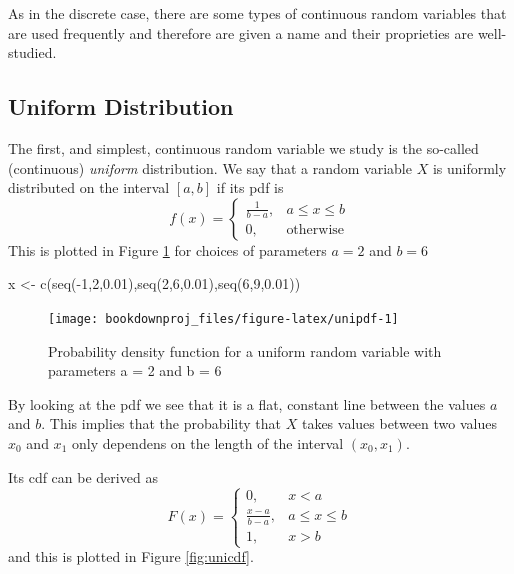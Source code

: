 \documentclass[
]{book}
\newenvironment{Shaded}{\begin{snugshade}}{\end{snugshade}}
\newcommand{\DecValTok}[1]{\textcolor[rgb]{0.00,0.00,0.81}{#1}}
\newcommand{\FloatTok}[1]{\textcolor[rgb]{0.00,0.00,0.81}{#1}}
\newcommand{\FunctionTok}[1]{\textcolor[rgb]{0.00,0.00,0.00}{#1}}
\newcommand{\NormalTok}[1]{#1}
\newcommand{\OtherTok}[1]{\textcolor[rgb]{0.56,0.35,0.01}{#1}}
\newcommand{\SpecialCharTok}[1]{\textcolor[rgb]{0.00,0.00,0.00}{#1}}
\begin{document}
As in the discrete case, there are some types of continuous random variables that are used frequently and therefore are given a name and their proprieties are well-studied.

\hypertarget{uniform-distribution}{%
\subsection{Uniform Distribution}\label{uniform-distribution}}

The first, and simplest, continuous random variable we study is the so-called (continuous) \emph{uniform} distribution. We say that a random variable \(X\) is uniformly distributed on the interval \([a,b]\) if its pdf is
\[
f(x)=\left\{ 
\begin{array}{ll}
\frac{1}{b-a}, & a\leq x \leq b\\
0, & \mbox{otherwise} 
\end{array}
\right.
\]
This is plotted in Figure \ref{fig:unipdf} for choices of parameters \(a=2\) and \(b=6\)

\begin{Shaded}
\begin{Highlighting}[]
\NormalTok{x }\OtherTok{\textless{}{-}} \FunctionTok{c}\NormalTok{(}\FunctionTok{seq}\NormalTok{(}\SpecialCharTok{{-}}\DecValTok{1}\NormalTok{,}\DecValTok{2}\NormalTok{,}\FloatTok{0.01}\NormalTok{),}\FunctionTok{seq}\NormalTok{(}\DecValTok{2}\NormalTok{,}\DecValTok{6}\NormalTok{,}\FloatTok{0.01}\NormalTok{),}\FunctionTok{seq}\NormalTok{(}\DecValTok{6}\NormalTok{,}\DecValTok{9}\NormalTok{,}\FloatTok{0.01}\NormalTok{))}
\end{Highlighting}
\end{Shaded}

\begin{figure}

{\centering \texttt{[image: bookdownproj\_files/figure-latex/unipdf-1]} 

}

\caption{Probability density function for a uniform random variable with parameters a = 2 and b = 6}\label{fig:unipdf}
\end{figure}

By looking at the pdf we see that it is a flat, constant line between the values \(a\) and \(b\). This implies that the probability that \(X\) takes values between two values \(x_0\) and \(x_1\) only dependens on the length of the interval \((x_0,x_1)\).

Its cdf can be derived as
\[
F(x)=\left\{
\begin{array}{ll}
0, & x<a\\
\frac{x-a}{b-a}, & a\leq x \leq b\\
1, & x>b
\end{array}
\right.
\]
and this is plotted in Figure \ref{fig:unicdf}.
\end{document}
